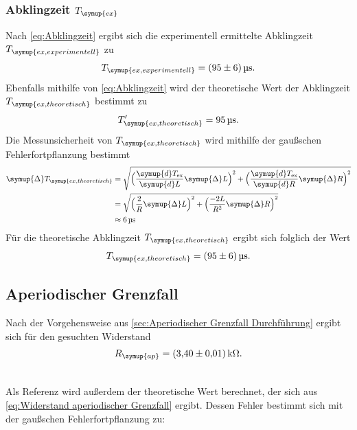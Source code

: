 \subsubsection{Abklingzeit $T_{\symup{ex}}$}
Nach \ref{eq:Abklingzeit} ergibt sich die experimentell ermittelte Abklingzeit $T_{\symup{ex, experimentell}}$ zu
\begin{equation*}
  T_{\symup{ex, experimentell}} = \qty{95+-6}{\micro\second}.
\end{equation*}
Ebenfalls mithilfe von \ref{eq:Abklingzeit} wird der theoretische Wert der Abklingzeit $T_{\symup{ex, theoretisch}}$ bestimmt zu
\begin{equation*}
  T'_{\symup{ex, theoretisch}} = \qty{95}{\micro\second}.
\end{equation*}
Die Messunsicherheit von $T_{\symup{ex, theoretisch}}$ wird mithilfe der gaußschen Fehlerfortpflanzung bestimmt
\begin{align*}
  \symup{\Delta}T_{\symup{ex, theoretisch}} &= \sqrt{\Bigl(\frac{\symup{d}T_{\text{ex}}}{\symup{d}L}\symup{\Delta} L \Bigr)^2+
  \Bigl(\frac{\symup{d}T_{\text{ex}}}{\symup{d}R}\symup{\Delta} R\Bigr)^2} \\
  &=\sqrt{\Bigl(\frac{2}{R}\symup{\Delta} L\Bigr)^2+\Bigl(\frac{-2L}{R^2}\symup{\Delta}R\Bigr)^2} \\
  &\approx \qty{6}{\micro\second}
\end{align*}
Für die theoretische Abklingzeit $T_{\symup{ex, theoretisch}}$ ergibt sich folglich der Wert
\begin{equation*}
  T_{\symup{ex, theoretisch}} = \qty{95+-6}{\micro\second}.
\end{equation*}

\subsection{Aperiodischer Grenzfall}
\label{sec:Aperiodischer Grenzfall}

Nach der Vorgehensweise aus \ref{sec:Aperiodischer Grenzfall Durchführung} ergibt sich für den gesuchten Widerstand \\
\begin{gather*}
  R_{\symup{ap}} = \qty{3,40+-0.01}{\kilo\ohm}. \\ \notag
\end{gather*}

Als Referenz wird außerdem der theoretische Wert berechnet, der sich aus \eqref{eq:Widerstand aperiodischer Grenzfall} ergibt.
Dessen Fehler bestimmt sich mit der gaußschen Fehlerfortpflanzung zu:


